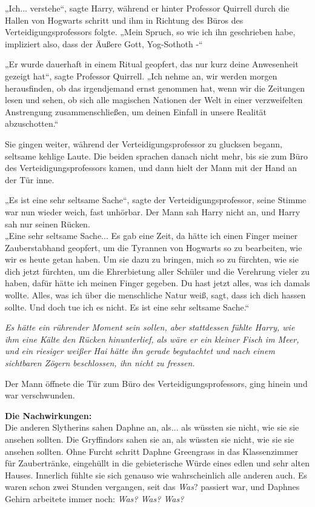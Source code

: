 {„Ich... verstehe“, sagte Harry, während er hinter Professor Quirrell durch die Hallen von Hogwarts schritt und ihm in Richtung des Büros des Verteidigungsprofessors folgte. „Mein Spruch, so wie ich ihn geschrieben habe, impliziert also, dass der Äußere Gott, Yog-Sothoth -“

„Er wurde dauerhaft in einem Ritual geopfert, das nur kurz deine Anwesenheit gezeigt hat“, sagte Professor Quirrell. „Ich nehme an, wir werden morgen herausfinden, ob das irgendjemand ernst genommen hat, wenn wir die Zeitungen lesen und sehen, ob sich alle magischen Nationen der Welt in einer verzweifelten Anstrengung zusammenschließen, um deinen Einfall in unsere Realität abzuschotten.“

Sie gingen weiter, während der Verteidigungsprofessor zu glucksen begann, seltsame kehlige Laute. Die beiden sprachen danach nicht mehr, bis sie zum Büro des Verteidigungsprofessors kamen, und dann hielt der Mann mit der Hand an der Tür inne.

„Es ist eine sehr seltsame Sache“, sagte der Verteidigungsprofessor, seine Stimme war nun wieder weich, fast unhörbar. Der Mann sah Harry nicht an, und Harry sah nur seinen Rücken.\\ „Eine sehr seltsame Sache... Es gab eine Zeit, da hätte ich einen Finger meiner Zauberstabhand geopfert, um die Tyrannen von Hogwarts so zu bearbeiten, wie wir es heute getan haben. Um sie dazu zu bringen, mich so zu fürchten, wie sie dich jetzt fürchten, um die Ehrerbietung aller Schüler und die Verehrung vieler zu haben, dafür hätte ich meinen Finger gegeben. Du hast jetzt alles, was ich damals wollte. Alles, was ich über die menschliche Natur weiß, sagt, dass ich dich hassen sollte. Und doch tue ich es nicht. Es ist eine sehr seltsame Sache.“

\emph{Es hätte ein rührender Moment sein sollen, aber stattdessen fühlte Harry, wie ihm eine Kälte den Rücken hinunterlief, als wäre er ein kleiner Fisch im Meer, und ein riesiger weißer Hai hätte ihn gerade begutachtet und nach einem sichtbaren Zögern beschlossen, ihn nicht zu fressen.}

Der Mann öffnete die Tür zum Büro des Verteidigungsprofessors, ging hinein und war verschwunden.

\textbf{Die Nachwirkungen:}\\ Die anderen Slytherins sahen Daphne an, als... als wüssten sie nicht, wie sie sie ansehen sollten. Die Gryffindors sahen sie an, als wüssten sie nicht, wie sie sie ansehen sollten. Ohne Furcht schritt Daphne Greengrass in das Klassenzimmer für Zaubertränke, eingehüllt in die gebieterische Würde eines edlen und sehr alten Hauses. Innerlich fühlte sie sich genauso wie wahrscheinlich alle anderen auch. Es waren schon zwei Stunden vergangen, seit das \emph{Was}? passiert war, und Daphnes Gehirn arbeitete immer noch: \emph{Was? Was? Was?}

}
